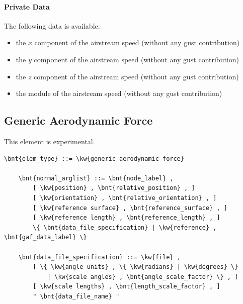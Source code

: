 \paragraph{Private Data}
The following data is available:
\begin{itemize}
\item {} the $x$ component of the airstream speed (without any gust contribution)
\item {} the $y$ component of the airstream speed (without any gust contribution)
\item {} the $z$ component of the airstream speed (without any gust contribution)
\item {} the module of the airstream speed (without any gust contribution)
\end{itemize}



\subsection{Generic Aerodynamic Force}
\label{sec:EL:AERO:GAF}
This element is experimental.
\begin{Verbatim}[commandchars=\\\{\}]
    \bnt{elem_type} ::= \kw{generic aerodynamic force}

    \bnt{normal_arglist} ::= \bnt{node_label} ,
        [ \kw{position} , \bnt{relative_position} , ]
        [ \kw{orientation} , \bnt{relative_orientation} , ]
        [ \kw{reference surface} , \bnt{reference_surface} , ]
        [ \kw{reference length} , \bnt{reference_length} , ]
        \{ \bnt{data_file_specification} | \kw{reference} , \bnt{gaf_data_label} \}

    \bnt{data_file_specification} ::= \kw{file} , 
        [ \{ \kw{angle units} , \{ \kw{radians} | \kw{degrees} \}
            | \kw{scale angles} , \bnt{angle_scale_factor} \} , ]
        [ \kw{scale lengths} , \bnt{length_scale_factor} , ]
        " \bnt{data_file_name} "
\end{Verbatim}

